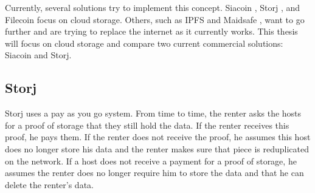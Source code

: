 Currently, several solutions try to implement this concept. Siacoin \cite{siacoin}, Storj \cite{storj}, and Filecoin \cite{filecoin} focus on cloud storage. Others, such as IPFS \cite{ipfs} and Maidsafe \cite{maidsafe}, want to go further and are trying to replace the internet as it currently works. This thesis will focus on cloud storage and compare two current commercial solutions: Siacoin and Storj.


\subsection{Storj}

\iffalse
# storj

- storj: uses a pay as you go system. every now and then you ask your storage providers for a proof that they are still holding your data. if you receive this proof, you pay them. If you do not receive a proof, you can assume this data is lost and make sure that piece of your date is reduplicated on the network. if a storage provider does not get paid for his proof, he can assume the user does not longer require him to store the data allowing him to delete this shard. 

- There are still some issues though: 
  - hosts take a risk when storing data, as they are never sure they will be paid. in the most extreme case, a malicious host might store a lot of data on the network, but never pay the first proof of storage, wasting this storage space. This effectively executes a denial of service attack on the network.
  - hosts do have no cost of not providing a proof of storage. 
  this makes the network very vulnerable to a sybil attack \ref{sybil-attack}. in which one malicious agent pretends to be several hosts at same time, at no cost. renters might think their data is secure, as it is duplicated over several hosts. However, the one malicious agent can turn off all his hosts, effectively destroying the stored data.


\fi


Storj uses a pay as you go system. From time to time, the renter asks the hosts for a proof of storage that they still hold the data. If the renter receives this proof, he pays them. If the renter does not receive the proof, he assumes this host does no longer store his data and the renter makes sure that piece is reduplicated on the network. If a host does not receive a payment for a proof of storage, he assumes the renter does no longer require him to store the data and that he can delete the renter's data. \cite{storj}

